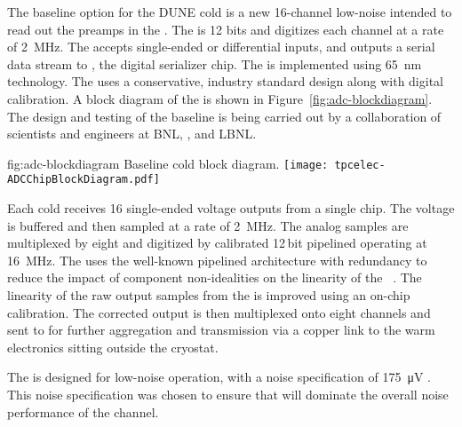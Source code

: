 The baseline option for the DUNE cold  is a new \num{16}-channel low-noise   intended to read out the  preamps in the  . The  is \num{12} bits and digitizes each channel at a rate of \SI{2}{MHz}. The  accepts single-ended or differential inputs, and outputs a serial data stream to , the  %
digital serializer chip. The   is implemented using \SI{65}{nm}  technology. The  uses a conservative, industry standard design along with digital calibration. A block diagram of the   is shown in Figure~\ref{fig:adc-blockdiagram}. The design and testing of the baseline   is being carried out by a collaboration of scientists and engineers at BNL, \fnal, and LBNL.

\begin{dunefigure}
{fig:adc-blockdiagram}
{Baseline cold   block diagram.}
\texttt{[image: tpcelec-ADCChipBlockDiagram.pdf]}
\end{dunefigure}

Each cold  receives \num{16} single-ended voltage outputs from a single  chip. The voltage is buffered and then sampled at a rate of \SI{2}{MHz}. The analog samples are multiplexed by eight and digitized by calibrated \num{12}\,bit pipelined  operating at \SI{16}{MHz}. The  uses the well-known pipelined architecture with redundancy to reduce the impact of component non-idealities on the linearity of the ~\cite{121557}. The linearity of the raw output samples from the  is improved using an on-chip calibration. The corrected  output is then multiplexed onto eight  channels and sent to  for further aggregation and transmission via a copper link to the warm electronics sitting outside the cryostat.

The   is designed for low-noise operation, with a noise specification of  \SI{175}{\micro\volt} \rms. This noise specification was chosen to ensure that  will dominate the overall noise performance of the channel.


